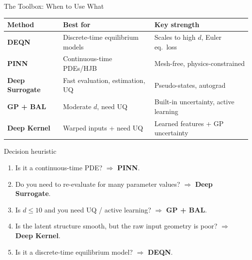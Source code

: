 \documentclass[aspectratio=169,11pt]{beamer}
\begin{document}
\begin{frame}{The Toolbox: When to Use What}
\begin{center}
\scriptsize
\begin{tabular}{l l l}
\toprule
\textbf{Method} & \textbf{Best for} & \textbf{Key strength} \\
\midrule
\textbf{DEQN} & Discrete-time equilibrium models & Scales to high $d$, Euler eq.\ loss \\
\textbf{PINN} & Continuous-time PDEs/HJB & Mesh-free, physics-constrained \\
\textbf{Deep Surrogate} & Fast evaluation, estimation, UQ & Pseudo-states, autograd \\
\textbf{GP + BAL} & Moderate $d$, need UQ & Built-in uncertainty, active learning \\
\textbf{Deep Kernel} & Warped inputs + need UQ & Learned features + GP uncertainty \\
\bottomrule
\end{tabular}
\end{center}

\vspace{0.15cm}
\begin{block}{Decision heuristic}
\scriptsize
\begin{enumerate}
  \item Is it a continuous-time PDE? $\Rightarrow$ \textbf{PINN}.
  \item Do you need to re-evaluate for many parameter values? $\Rightarrow$ \textbf{Deep Surrogate}.
  \item Is $d \leq 10$ and you need UQ / active learning? $\Rightarrow$ \textbf{GP + BAL}.
  \item Is the latent structure smooth, but the raw input geometry is poor? $\Rightarrow$ \textbf{Deep Kernel}.
  \item Is it a discrete-time equilibrium model? $\Rightarrow$ \textbf{DEQN}.
\end{enumerate}
\end{block}
\end{frame}
\end{document}

